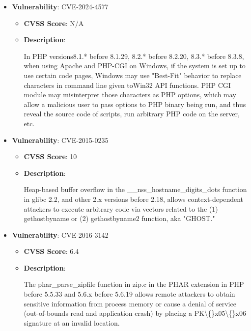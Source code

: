 \documentclass{article}
\begin{document}
\begin{itemize}
        \item \textbf{Vulnerability}: CVE-2024-4577
        \begin{itemize}
            \item \textbf{CVSS Score}:  N/A 
            \item \textbf{Description}:
            \parbox[t]{0.9\linewidth}{
                \ttfamily In PHP versions8.1.* before 8.1.29, 8.2.* before 8.2.20, 8.3.* before 8.3.8, when using Apache and PHP-CGI on Windows, if the system is set up to use certain code pages, Windows may use "Best-Fit" behavior to replace characters in command line given toWin32 API functions. PHP CGI module may misinterpret those characters as PHP options, which may allow a malicious user to pass options to PHP binary being run, and thus reveal the source code of scripts, run arbitrary PHP code on the server, etc.
            }
        \end{itemize}
    
        \item \textbf{Vulnerability}: CVE-2015-0235
        \begin{itemize}
            \item \textbf{CVSS Score}:  10 
            \item \textbf{Description}:
            \parbox[t]{0.9\linewidth}{
                \ttfamily Heap-based buffer overflow in the \_\_nss\_hostname\_digits\_dots function in glibc 2.2, and other 2.x versions before 2.18, allows context-dependent attackers to execute arbitrary code via vectors related to the (1) gethostbyname or (2) gethostbyname2 function, aka "GHOST."
            }
        \end{itemize}
    
        \item \textbf{Vulnerability}: CVE-2016-3142
        \begin{itemize}
            \item \textbf{CVSS Score}:  6.4 
            \item \textbf{Description}:
            \parbox[t]{0.9\linewidth}{
                \ttfamily The phar\_parse\_zipfile function in zip.c in the PHAR extension in PHP before 5.5.33 and 5.6.x before 5.6.19 allows remote attackers to obtain sensitive information from process memory or cause a denial of service (out-of-bounds read and application crash) by placing a PK\textbackslash\{\}x05\textbackslash\{\}x06 signature at an invalid location.
            }
        \end{itemize}
    

\end{itemize}
\end{document}
